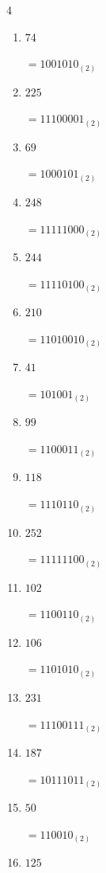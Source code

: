 \begin{multicols}{4}
\begin{enumerate}
        $=1110010_{(2)}$

  \item $74$

        $=1001010_{(2)}$

  \item $225$

        $=11100001_{(2)}$

  \item $69$

        $=1000101_{(2)}$

  \item $248$

        $=11111000_{(2)}$

  \item $244$

        $=11110100_{(2)}$

  \item $210$

        $=11010010_{(2)}$

  \item $41$

        $=101001_{(2)}$

\columnbreak %

  \item $99$

        $=1100011_{(2)}$

  \item $118$

        $=1110110_{(2)}$

  \item $252$

        $=11111100_{(2)}$

  \item $102$

        $=1100110_{(2)}$

  \item $106$

        $=1101010_{(2)}$

  \item $231$

        $=11100111_{(2)}$

  \item $187$

        $=10111011_{(2)}$

  \item $50$

        $=110010_{(2)}$

  \item $125$


\end{enumerate}
\end{multicols}
